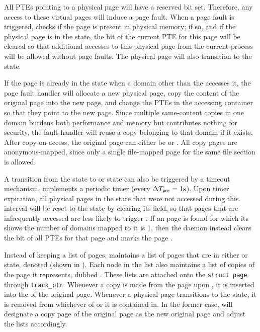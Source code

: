 All \gls{PTE}s pointing to a \shared physical page will have a reserved \COA
bit set. Therefore, any access to these virtual pages will induce a
page fault.  When a page fault is triggered, \cachebar checks if the
page is present in physical memory; if so, and if the physical page is
in the \shared state, the \COA bit of the current \gls{PTE} for this page
will be cleared so that additional accesses to this physical page from
the current process will be allowed without page faults.  The physical
page will also transition to the \accessed state.

\bheading{\accessed $\Rightarrow$ \exclusive/\shared}  If the page is
already in the \accessed state when a domain other than the \owner
accesses it, the page fault handler will allocate a new physical page,
copy the content of the original page into the new page, and change
the \gls{PTE}s in the accessing container so that they
point to the new page. Since multiple same-content copies in one
domain burdens both performance and memory but contributes nothing for
security, the fault handler will reuse a copy belonging to that domain
if it exists. After copy-on-access, the original page can either be
\exclusive or \shared.  All copy pages are anonymous-mapped, since
only a single file-mapped page for the same file section is allowed.

A transition from the \accessed state to \shared or \exclusive state
can also be triggered by a timeout mechanism. \cachebar implements a
periodic timer (every $\Delta{T}_{\mathsf{acc}} = 1\mathrm{s}$). Upon timer
expiration, all physical pages in the \accessed state that were
not accessed during this \accessedTimeout interval will be reset to
the \shared state by clearing its \owner field, so that pages that are
infrequently accessed are less likely to trigger \coa.  If an
\accessed page is found for which its \pcounterincontainer shows the
number of domains mapped to it is 1, then the daemon instead clears
the \COA bit of all \gls{PTE}s for that page and marks the page \exclusive.

Instead of keeping a list of \accessed pages, \cachebar maintains a
list of pages that are in either \shared or \accessed state, denoted
\originalpagelist (shown in ). Each node in the
list also maintains a list of copies of the page it represents, dubbed
\copypagelist. These lists are attached onto the \texttt{struct page}
through \texttt{track\_ptr}.  Whenever a copy is made from the page
upon \coa, it is inserted into the \copypagelist of the original page.
Whenever a physical page transitions to the \unmapped state, it is
removed from whichever of \originalpagelist or \copypagelist it is
contained in.  In the former case, \cachebar will designate a copy
page of the original page as the new original page and adjust the
lists accordingly.

